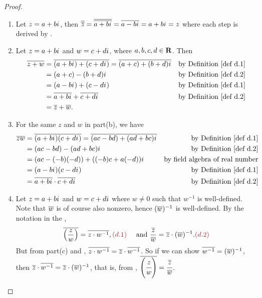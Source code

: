 \begin{proof} \ 

\begin{enumerate}
\item Let \(z = a + b{i\mkern1mu}\), then \(\overline{\overline{z}} = \overline{\overline{a + b {i\mkern1mu}}} = \overline{a - b{i\mkern1mu}} = a + b{i\mkern1mu} = z\) where each step is derived by .

\item Let \(z = a + b{i\mkern1mu}\) and \(w = c + d{i\mkern1mu}\), where \(a, b, c, d \in \mathbf{R}\).
Then
\begin{align*}
    \conjugatet{z + w} & = \conjugatet{(a + b\iu) + (c + d\iu)} = \conjugatet{(a + c) + (b + d)\iu} & \text{by \DEF{d.1}} \\
        & = (a + c) - (b + d)\iu & \text{by \DEF{d.2}} \\
        & = (a - b\iu) + (c - d\iu) & \text{by \DEF{d.1}} \\
        & = \conjugatet{a + b\iu} + \conjugatet{c + d\iu} & \text{by \DEF{d.2}} \\
        & = \conjugatet{z} + \conjugatet{w}.
\end{align*}

\item For the same \(z\) and \(w\) in part(b), we have
\begin{align*}
    \conjugatet{zw} & = \conjugatet{(a + b\iu)(c + d\iu)} = \conjugatet{(ac - bd) + (ad + bc)\iu} & \text{by \DEF{d.1}} \\
        & = (ac - bd) - (ad + bc)\iu & \text{by \DEF{d.2}} \\
        & = (ac - (-b)(-d)) + ((-b)c + a(-d))\iu & \text{by field algebra of real number} \\
        & = (a - b\iu)(c - d\iu) & \text{by \DEF{d.1}} \\
        & = \conjugatet{a + b\iu} \cdot \conjugatet{c + d\iu} & \text{by \DEF{d.2}}
\end{align*}

\item Let \(z = a + b{i\mkern1mu}\) and \(w = c + d{i\mkern1mu}\) where \(w \ne 0\) such that \(w^{-1}\) is well-defined.
Note that \(\overline{w}\) is of course also nonzero, hence \((\overline{w})^{-1}\) is well-defined.
By the notation in the ,
\[
    \conjugatet{\left(\frac{z}{w}\right)} = \conjugatet{z \cdot w^{-1}}, \MAROON{(d.1)} \quad \text{ and } \frac{\conjugatet{z}}{\conjugatet{w}} = \conjugatet{z} \cdot (\conjugatet{w})^{-1}. \MAROON{(d.2)}
\]
But from part(c) and , \(\overline{z \cdot w^{-1}} = \overline{z} \cdot \overline{w^{-1}}\). 
So if we can show \(\overline{w^{-1}} = (\overline{w})^{-1}\), then \(\overline{z} \cdot \overline{w^{-1}} = \overline{z} \cdot (\overline{w})^{-1}\),
that is, from , \(\overline{\left(\cfrac{z}{w}\right)} = \cfrac{\overline{z}}{\overline{w}}\).


\end{enumerate}
\end{proof}
